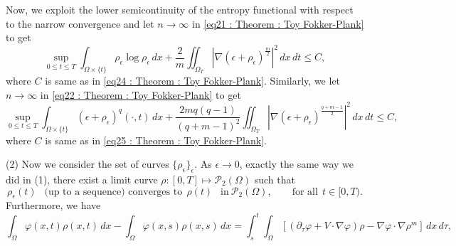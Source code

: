 \documentclass{amsart}
\numberwithin{equation}{section}
\begin{document}
Now, we exploit the lower semicontinuity of the entropy functional with respect to the narrow convergence and let $n \rightarrow \infty$ in \eqref{eq21 : Theorem : Toy Fokker-Plank} to get
\begin{equation*}\label{eq23 : Theorem : Toy Fokker-Plank}
\sup_{0\leq t \leq T}\int_{\Omega \times \{ t\}} \rho_\epsilon\log \rho_\epsilon\,dx
 +  \frac{2}{m}\iint_{\Omega_T} \left|\nabla (\epsilon+\rho_\epsilon)^{\frac{m}{2}}\right|^2 \,dx\,dt \le C,
\end{equation*}
where $C$ is same as in \eqref{eq24 : Theorem : Toy Fokker-Plank}. %
Similarly, we let $n \rightarrow \infty$ in \eqref{eq22 : Theorem : Toy Fokker-Plank} to get
\begin{equation*}\label{eq27 : Theorem : Toy Fokker-Plank}
 \sup_{0\leq t \leq T}\int_{\Omega \times \{ t\}} (\epsilon+\rho_\epsilon)^q (\cdot, t) \,dx
 +  \frac{2mq(q-1)}{(q+m-1)^2}\iint_{\Omega_T} \left|\nabla (\epsilon+\rho_\epsilon)^{\frac{q+m-1}{2}}\right|^2 \,dx\,dt \le  C ,
\end{equation*}
where $C$ is same as in \eqref{eq25 : Theorem : Toy Fokker-Plank}.

(2) Now we consider the set of curves $\{\rho_\epsilon \}_\epsilon$. As $\epsilon \rightarrow 0$, exactly the same way we did in (1), there exist a limit
curve  $\rho :[0,T]\mapsto \mathcal{P}_{2}(\Omega)$ such that 
\begin{equation*}
\rho_{\epsilon}(t) ~~ \mbox{ (up to a sequence) converges to} ~~\rho (t) ~~ \mbox{ in} ~
\mathcal{P}_{2}({\Omega}), \qquad \text{for all} ~~ t\in[0,T).
\end{equation*}
Furthermore, we have
\begin{equation}\label{eq13 : Theorem : Toy Fokker-Plank}
 \int_{\Omega}\varphi(x,t) \rho(x,t) \,dx - \int_{\Omega}\varphi(x,s) \rho(x,s)\,dx
=\int_{s}^{t} \int_{\Omega}  \left [ \left(\partial_\tau\varphi  + V
\cdot \nabla \varphi \right){\rho} -\nabla  \varphi \cdot \nabla  \rho^m   \right ] \,dx\,d\tau,
\end{equation}
\end{document}
